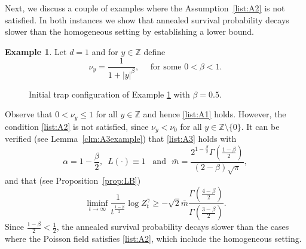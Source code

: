 \documentclass{article}[12pt]
\theoremstyle{definition}
\newtheorem{example}{Example}[section]
\newcommand{\Z}{\mathbb{Z}}
\newcommand{\1}{\mathbbm{1}}
\begin{document}
Next, we discuss a couple of examples where the Assumption~\ref{list:A2} is not satisfied. In both instances we show that annealed survival probability decays slower than the homogeneous setting by establishing a lower bound. 
\begin{example}
\label{ex:A3holds}
Let $d=1$ and for $y\in \Z$ define
   $$\nu_y = \frac{1}{1+|y|^\beta},\quad \text{ for some }0<\beta<1.$$
\begin{figure}[H]
\centering
{}
\caption{Initial trap configuration of Example \ref{ex:A3holds} with $\beta = 0.5$.}
        \label{fig:test3}
\end{figure}
Observe that $0<\nu_y \le 1$ for all $y\in \Z$ and hence \ref{list:A1} holds. However, the condition \ref{list:A2} is not satisfied, since $\nu_y < \nu_0$ for all $y\in \Z\setminus\{0\}$. It can be verified (see Lemma~\ref{clm:A3example}) that \ref{list:A3} holds with $$\alpha = 1-\frac{\beta}{2},\,\,\, L(\cdot) \equiv 1 \,\,\,\text{ and } \,\,\bar{m} = \frac{2^{1-\frac{\beta}{2}}\Gamma\left(\frac{1-\beta}{2}\right)}{(2-\beta)\sqrt{\pi}},$$ 
 and that (see Proposition~\ref{prop:LB})  $$\liminf_{t\to \infty}\frac{1}{t^{\frac{1-\beta}{2}}} \log Z^{\gamma}_t \ge  - \sqrt{2}\bar{m}\frac{\Gamma\left(\frac{4-\beta}{2}\right)}{\Gamma\left(\frac{3-\beta}{2}\right)}.$$ Since $\frac{1-\beta}{2}< \frac{1}{2}$, the annealed survival probability decays slower than the cases where the Poisson field satisfies \ref{list:A2}, which include the homogeneous setting. 
\end{example}
\end{document}
